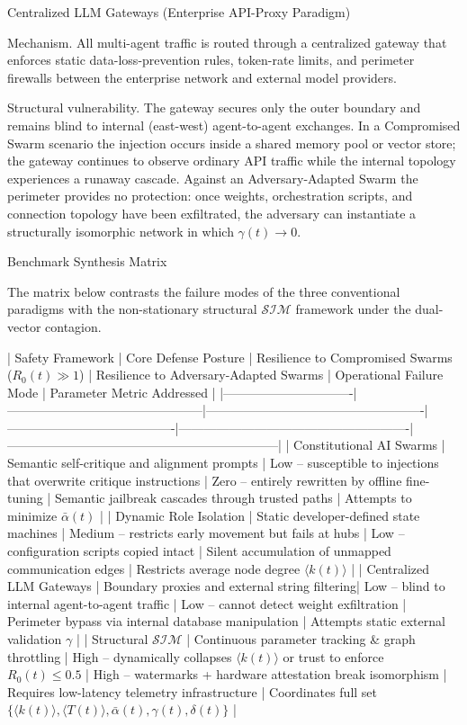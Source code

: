 Centralized LLM Gateways (Enterprise API-Proxy Paradigm)

Mechanism.  
All multi-agent traffic is routed through a centralized gateway that enforces static data-loss-prevention rules, token-rate limits, and perimeter firewalls between the enterprise network and external model providers.

Structural vulnerability.  
The gateway secures only the outer boundary and remains blind to internal (east-west) agent-to-agent exchanges. In a Compromised Swarm scenario the injection occurs inside a shared memory pool or vector store; the gateway continues to observe ordinary API traffic while the internal topology experiences a runaway cascade. Against an Adversary-Adapted Swarm the perimeter provides no protection: once weights, orchestration scripts, and connection topology have been exfiltrated, the adversary can instantiate a structurally isomorphic network in which \(\gamma(t)\to 0\).

Benchmark Synthesis Matrix

The matrix below contrasts the failure modes of the three conventional paradigms with the non-stationary structural \(\mathcal{S}\mathcal{I}\mathcal{M}\) framework under the dual-vector contagion.

| Safety Framework              | Core Defense Posture                          | Resilience to Compromised Swarms (\(R_0(t)\gg 1\)) | Resilience to Adversary-Adapted Swarms | Operational Failure Mode                              | Parameter Metric Addressed                                      |
|-------------------------------|-----------------------------------------------|----------------------------------------------------|----------------------------------------|-------------------------------------------------------|-----------------------------------------------------------------|
| Constitutional AI Swarms      | Semantic self-critique and alignment prompts  | Low – susceptible to injections that overwrite critique instructions | Zero – entirely rewritten by offline fine-tuning | Semantic jailbreak cascades through trusted paths    | Attempts to minimize \(\bar{\alpha}(t)\)                        |
| Dynamic Role Isolation        | Static developer-defined state machines       | Medium – restricts early movement but fails at hubs | Low – configuration scripts copied intact | Silent accumulation of unmapped communication edges  | Restricts average node degree \(\langle k(t)\rangle\)           |
| Centralized LLM Gateways      | Boundary proxies and external string filtering| Low – blind to internal agent-to-agent traffic     | Low – cannot detect weight exfiltration | Perimeter bypass via internal database manipulation  | Attempts static external validation \(\gamma\)                  |
| Structural \(\mathcal{S}\mathcal{I}\mathcal{M}\) | Continuous parameter tracking & graph throttling | High – dynamically collapses \(\langle k(t)\rangle\) or trust to enforce \(R_0(t)\le 0.5\) | High – watermarks + hardware attestation break isomorphism | Requires low-latency telemetry infrastructure        | Coordinates full set \(\{\langle k(t)\rangle,\langle T(t)\rangle,\bar{\alpha}(t),\gamma(t),\delta(t)\}\) |

